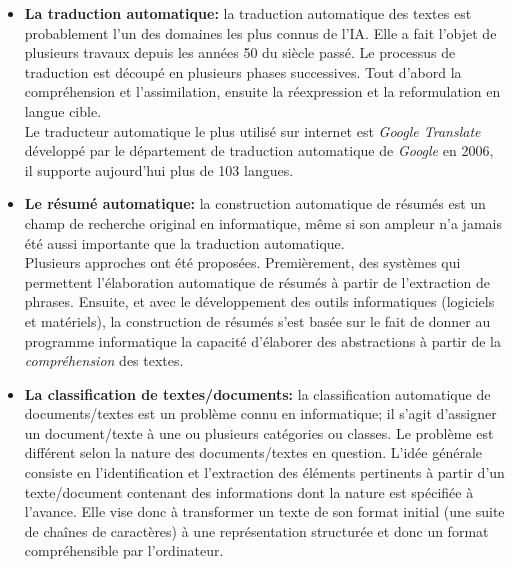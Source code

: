 \begin{itemize}
    \item \textbf{La traduction automatique:}
    la traduction automatique des textes est probablement l'un des domaines les plus connus de l'IA. Elle a fait l'objet de plusieurs travaux depuis les années 50 du siècle passé. Le processus de traduction est découpé en plusieurs phases successives. Tout d'abord la compréhension et l'assimilation, ensuite la réexpression et la reformulation en langue cible.\\
    Le traducteur automatique le plus utilisé sur internet est \emph{Google Translate} développé par le département de traduction automatique de \emph{Google} en 2006, il supporte aujourd'hui plus de 103 langues\cite{ggltrans}.

    \item \textbf{Le résumé automatique:}
    la construction automatique de résumés est un champ de recherche original en informatique, même si son ampleur n'a jamais été aussi importante que la traduction automatique.\\
    Plusieurs approches ont été proposées. Premièrement, des systèmes qui permettent l'élaboration automatique de résumés à partir de l'extraction de phrases. Ensuite, et avec le développement des outils informatiques (logiciels et matériels), la construction de résumés s'est basée sur le fait de donner au programme informatique la capacité d'élaborer des abstractions à partir de la \emph{compréhension} des textes.

    \item \textbf{La classification de textes/documents:}
    la classification automatique de documents/textes est un problème connu en informatique; il s'agit d'assigner un document/texte à une ou plusieurs catégories ou classes. Le problème est différent selon la nature des documents/textes en question. L'idée générale consiste en l'identification et l'extraction des éléments pertinents à partir d'un texte/document contenant des informations dont la nature est spécifiée à l'avance. Elle vise donc à transformer un texte de son format initial (une suite de chaînes de caractères) à une représentation structurée et donc un format compréhensible par l'ordinateur.\\
\end{itemize}

